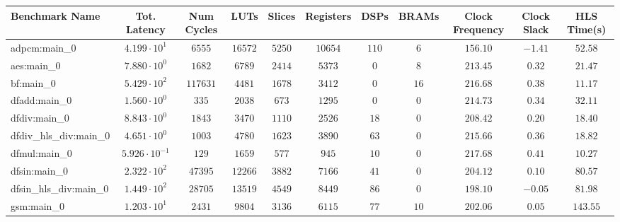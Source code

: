 \begin{tabular}{|l|c|c|c|c|c|c|c|c|c|c|}
\hline
Benchmark Name          & Tot. Latency            & Num Cycles & LUTs       & Slices    & Registers & DSPs    & BRAMs   & Clock Frequency & Clock Slack & HLS Time(s) \\
\hline
adpcm:main\_0           & $ 4.199 \cdot 10^{1}  $ & $ 6555   $ & $ 16572  $ & $ 5250  $ & $ 10654 $ & $ 110 $ & $ 6   $ & $ 156.10      $ & $ -1.41   $ & $ 52.58   $ \\
aes:main\_0             & $ 7.880 \cdot 10^{0}  $ & $ 1682   $ & $ 6789   $ & $ 2414  $ & $ 5373  $ & $ 0   $ & $ 8   $ & $ 213.45      $ & $ 0.32    $ & $ 21.47   $ \\
bf:main\_0              & $ 5.429 \cdot 10^{2}  $ & $ 117631 $ & $ 4481   $ & $ 1678  $ & $ 3412  $ & $ 0   $ & $ 16  $ & $ 216.68      $ & $ 0.38    $ & $ 11.17   $ \\
dfadd:main\_0           & $ 1.560 \cdot 10^{0}  $ & $ 335    $ & $ 2038   $ & $ 673   $ & $ 1295  $ & $ 0   $ & $ 0   $ & $ 214.73      $ & $ 0.34    $ & $ 32.11   $ \\
dfdiv:main\_0           & $ 8.843 \cdot 10^{0}  $ & $ 1843   $ & $ 3470   $ & $ 1110  $ & $ 2526  $ & $ 18  $ & $ 0   $ & $ 208.42      $ & $ 0.20    $ & $ 18.40   $ \\
dfdiv\_hls\_div:main\_0 & $ 4.651 \cdot 10^{0}  $ & $ 1003   $ & $ 4780   $ & $ 1623  $ & $ 3890  $ & $ 63  $ & $ 0   $ & $ 215.66      $ & $ 0.36    $ & $ 18.82   $ \\
dfmul:main\_0           & $ 5.926 \cdot 10^{-1} $ & $ 129    $ & $ 1659   $ & $ 577   $ & $ 945   $ & $ 10  $ & $ 0   $ & $ 217.68      $ & $ 0.41    $ & $ 10.27   $ \\
dfsin:main\_0           & $ 2.322 \cdot 10^{2}  $ & $ 47395  $ & $ 12266  $ & $ 3882  $ & $ 7166  $ & $ 41  $ & $ 0   $ & $ 204.12      $ & $ 0.10    $ & $ 80.57   $ \\
dfsin\_hls\_div:main\_0 & $ 1.449 \cdot 10^{2}  $ & $ 28705  $ & $ 13519  $ & $ 4549  $ & $ 8449  $ & $ 86  $ & $ 0   $ & $ 198.10      $ & $ -0.05   $ & $ 81.98   $ \\
gsm:main\_0             & $ 1.203 \cdot 10^{1}  $ & $ 2431   $ & $ 9804   $ & $ 3136  $ & $ 6115  $ & $ 77  $ & $ 10  $ & $ 202.06      $ & $ 0.05    $ & $ 143.55  $ \\

\end{tabular}
